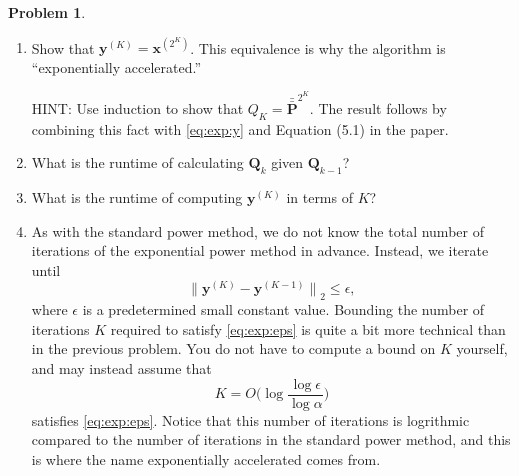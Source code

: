 \documentclass[10pt]{article}
\theoremstyle{definition}
\newtheorem{problem}{Problem}
\newcommand{\Q}{\mathbf Q}
\newcommand{\p}{\mathbf P}
\newcommand{\pb}{\bar {\p}}
\newcommand{\pbb}{\bar {\pb}}
\newcommand{\x}{\mathbf x}
\newcommand{\y}{\mathbf y}
\newcommand{\ltwo}[1]{{\lVert {#1} \rVert}_2}
\begin{document}
{\begin{problem}
    \begin{enumerate}
        \item
            Show that $\y^{(K)} = \x^{(2^K)}$.
            This equivalence is why the algorithm is ``exponentially accelerated.''

            HINT: 
            Use induction to show that $Q_{K} = \pbb^{2^{K}}$.
            The result follows by combining this fact with \eqref{eq:exp:y} and Equation (5.1) in the paper.
            \vspace{3in}

        \newpage
        \item
            What is the runtime of calculating $\Q_k$ given $\Q_{k-1}$? 
            \vspace{4in}

        \item 
            What is the runtime of computing $\y^{(K)}$ in terms of $K$?
            \vspace{3in}

        \newpage
        \item
            As with the standard power method, we do not know the total number of iterations of the exponential power method in advance.
            Instead, we iterate until
            \begin{equation}
                \label{eq:exp:eps}
                \ltwo{\y^{(K)}-\y^{(K-1)}} \le \epsilon,
            \end{equation}
            where $\epsilon$ is a predetermined small constant value.
            Bounding the number of iterations $K$ required to satisfy \eqref{eq:exp:eps} is quite a bit more technical than in the previous problem.
            You do not have to compute a bound on $K$ yourself,
            and may instead assume that 
            \begin{equation}
                \label{eq:exp:2}
                K = O\bigg( \log \frac{\log \epsilon}{\log \alpha} \bigg)
            \end{equation}
            satisfies \eqref{eq:exp:eps}.
            Notice that this number of iterations is logrithmic compared to the number of iterations in the standard power method,
            and this is where the name exponentially accelerated comes from.


\end{enumerate}
\end{problem}}
\end{document}
